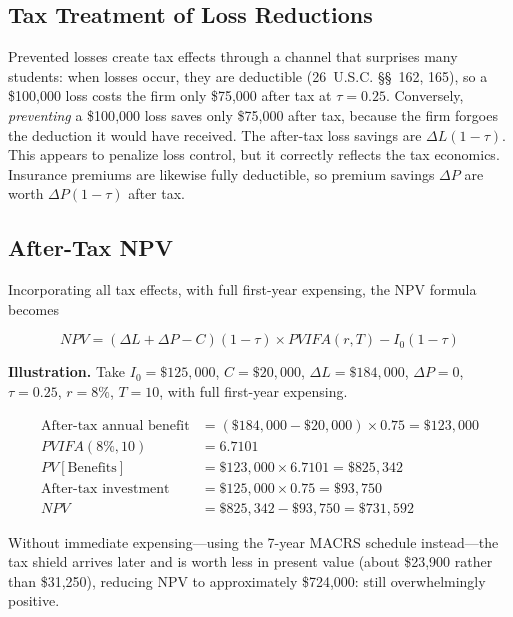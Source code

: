 \documentclass[11pt,openany]{book}
\begin{document}
\subsection{Tax Treatment of Loss Reductions}

Prevented losses create tax effects through a channel that surprises many
students: when losses occur, they are deductible (26~U.S.C. \S\S~162, 165), so
a \$100{,}000 loss costs the firm only \$75{,}000 after tax at
\(\tau = 0.25\). Conversely, \emph{preventing} a \$100{,}000 loss saves only
\$75{,}000 after tax, because the firm forgoes the deduction it would have
received. The after-tax loss savings are \(\Delta L(1-\tau)\). This appears to
penalize loss control, but it correctly reflects the tax economics. Insurance
premiums are likewise fully deductible, so premium savings \(\Delta P\) are
worth \(\Delta P(1-\tau)\) after tax.

\subsection{After-Tax NPV}

Incorporating all tax effects, with full first-year expensing, the NPV formula
becomes

\begin{equation}
\label{eq:after-tax-npv}
NPV = (\Delta L + \Delta P - C)(1-\tau) \times PVIFA(r,T) - I_0(1-\tau)
\end{equation}

\textbf{Illustration.} Take \(I_0 = \$125{,}000\), \(C = \$20{,}000\),
\(\Delta L = \$184{,}000\), \(\Delta P = 0\), \(\tau = 0.25\), \(r = 8\%\),
\(T = 10\), with full first-year expensing.

\begin{align*}
\text{After-tax annual benefit} &= (\$184{,}000 - \$20{,}000) \times 0.75 =
  \$123{,}000 \\
PVIFA(8\%, 10) &= 6.7101 \\
PV[\text{Benefits}] &= \$123{,}000 \times 6.7101 = \$825{,}342 \\
\text{After-tax investment} &= \$125{,}000 \times 0.75 = \$93{,}750 \\
NPV &= \$825{,}342 - \$93{,}750 = \$731{,}592
\end{align*}

Without immediate expensing---using the 7-year MACRS schedule instead---the
tax shield arrives later and is worth less in present value (about \$23{,}900
rather than \$31{,}250), reducing NPV to approximately \$724{,}000: still
overwhelmingly positive.
\end{document}
